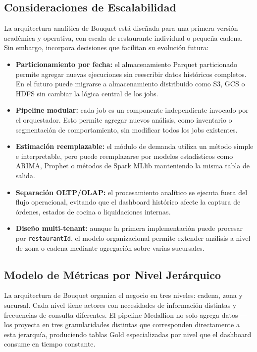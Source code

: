 \subsection{Consideraciones de Escalabilidad}

La arquitectura analítica de Bouquet está diseñada para una primera versión académica y
operativa, con escala de restaurante individual o pequeña cadena. Sin embargo, incorpora
decisiones que facilitan su evolución futura:

\begin{itemize}[leftmargin=1.5em]
  \item \textbf{Particionamiento por fecha:} el almacenamiento Parquet particionado permite
  agregar nuevas ejecuciones sin reescribir datos históricos completos. En el futuro puede
  migrarse a almacenamiento distribuido como S3, GCS o HDFS sin cambiar la lógica central
  de los jobs.

  \item \textbf{Pipeline modular:} cada job es un componente independiente invocado por el
  orquestador. Esto permite agregar nuevos análisis, como inventario o segmentación de
  comportamiento, sin modificar todos los jobs existentes.

  \item \textbf{Estimación reemplazable:} el módulo de demanda utiliza un método simple e
  interpretable, pero puede reemplazarse por modelos estadísticos como ARIMA, Prophet o
  métodos de Spark MLlib manteniendo la misma tabla de salida.

  \item \textbf{Separación OLTP/OLAP:} el procesamiento analítico se ejecuta fuera del flujo
  operacional, evitando que el dashboard histórico afecte la captura de órdenes, estados
  de cocina o liquidaciones internas.

  \item \textbf{Diseño multi-tenant:} aunque la primera implementación puede procesar por
  \texttt{restaurantId}, el modelo organizacional permite extender análisis a nivel de zona
  o cadena mediante agregación sobre varias sucursales.
\end{itemize}

\subsection{Modelo de Métricas por Nivel Jerárquico}

La arquitectura de Bouquet organiza el negocio en tres niveles: cadena, zona y sucursal. Cada nivel tiene actores con necesidades de información distintas y frecuencias de consulta diferentes. El pipeline Medallion no solo agrega datos --- los proyecta en tres granularidades distintas que corresponden directamente a esta jerarquía, produciendo tablas Gold especializadas por nivel que el dashboard consume en tiempo constante.

